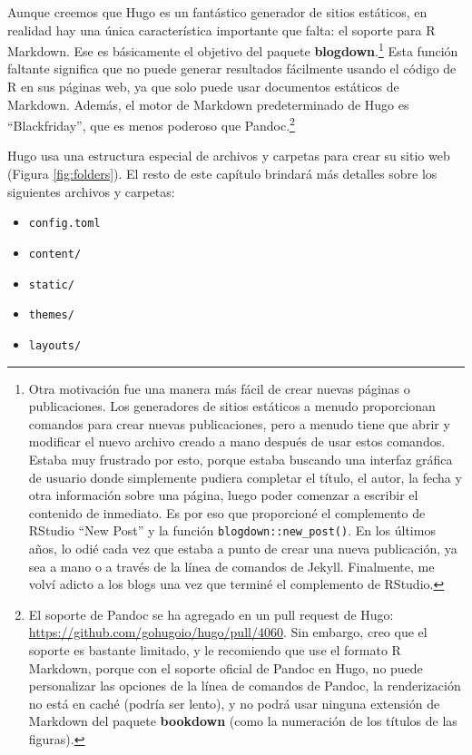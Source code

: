 \documentclass[12pt,]{krantz}
\providecommand{\tightlist}{%
  \setlength{\itemsep}{0pt}\setlength{\parskip}{0pt}}
\theoremstyle{definition}
\theoremstyle{definition}
\theoremstyle{definition}
\theoremstyle{remark}
\begin{document}
Aunque creemos que Hugo es un fantástico generador de sitios estáticos,
en realidad hay una única característica importante que falta: el
soporte para R Markdown. Ese es básicamente el objetivo del paquete
\textbf{blogdown}.\footnote{Otra motivación fue una manera más fácil de
  crear nuevas páginas o publicaciones. Los generadores de sitios
  estáticos a menudo proporcionan comandos para crear nuevas
  publicaciones, pero a menudo tiene que abrir y modificar el nuevo
  archivo creado a mano después de usar estos comandos. Estaba muy
  frustrado por esto, porque estaba buscando una interfaz gráfica de
  usuario donde simplemente pudiera completar el título, el autor, la
  fecha y otra información sobre una página, luego poder comenzar a
  escribir el contenido de inmediato. Es por eso que proporcioné el
  complemento de RStudio ``New Post'' y la función
  \texttt{blogdown::new\_post()}. En los últimos años, lo odié cada vez
  que estaba a punto de crear una nueva publicación, ya sea a mano o a
  través de la línea de comandos de Jekyll. Finalmente, me volví adicto
  a los blogs una vez que terminé el complemento de RStudio.} Esta
función faltante significa que no puede generar resultados fácilmente
usando el código de R en sus páginas web, ya que solo puede usar
documentos estáticos de Markdown. Además, el motor de Markdown
predeterminado de Hugo es ``Blackfriday'', que es menos poderoso que
Pandoc.\footnote{El soporte de Pandoc se ha agregado en un pull request
  de Hugo: \url{https://github.com/gohugoio/hugo/pull/4060}. Sin
  embargo, creo que el soporte es bastante limitado, y le recomiendo que
  use el formato R Markdown, porque con el soporte oficial de Pandoc en
  Hugo, no puede personalizar las opciones de la línea de comandos de
  Pandoc, la renderización no está en caché (podría ser lento), y no
  podrá usar ninguna extensión de Markdown del paquete \textbf{bookdown}
  (como la numeración de los títulos de las figuras).}

Hugo usa una estructura especial de archivos y carpetas para crear su
sitio web (Figura \ref{fig:folders}). El resto de este capítulo brindará
más detalles sobre los siguientes archivos y carpetas:

\begin{itemize}
\tightlist
\item
  \texttt{config.toml}
\item
  \texttt{content/}
\item
  \texttt{static/}
\item
  \texttt{themes/}
\item
  \texttt{layouts/}
\end{itemize}
\end{document}
